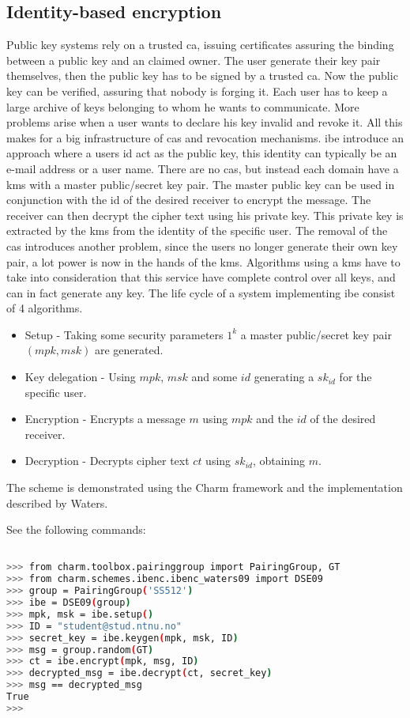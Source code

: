 \subsection{Identity-based encryption}\label{subsec:IBE}
Public key systems rely on a trusted \gls{ca}, issuing certificates assuring the binding between a public key and an claimed owner. The user generate their key pair themselves, then the public key has to be signed by a trusted \glsdesc{ca}. Now the public key can be verified, assuring that nobody is forging it. Each user has to keep a large archive of keys belonging to whom he wants to communicate. More problems arise when a user wants to declare his key invalid and revoke it. All this makes for a big infrastructure of \glspl{ca} and revocation mechanisms. \Gls{ibe}\cite{DBLP:ibe} introduce an approach where a users id act as the public key, this identity can typically be an e-mail address or a user name. There are no \glspl{ca}, but instead each domain have a \gls{kms} with a master public/secret key pair. The master public key can be used in conjunction with the id of the desired receiver to encrypt the message. The receiver can then decrypt the cipher text using his private key. This private key is extracted by the \gls{kms} from the identity of the specific user. The removal of the \glspl{ca} introduces another problem, since the users no longer generate their own key pair, a lot power is now in the hands of the \gls{kms}. Algorithms using a \gls{kms} have to take into consideration that this service have complete control over all keys, and can in fact generate any key. The life cycle of a system implementing \gls{ibe} consist of 4 algorithms. 

\begin{itemize}
\item Setup - Taking some security parameters $1^k$ a master public/secret key pair $(mpk, msk)$ are generated.
\item Key delegation - Using $mpk$, $msk$ and some $id$ generating a $sk_{id}$ for the specific user. 
\item Encryption - Encrypts a message $m$ using $mpk$ and the $id$ of the desired receiver. 
\item Decryption - Decrypts cipher text $ct$ using $sk_{id}$, obtaining $m$. 
\end{itemize}

The scheme is demonstrated using the Charm framework and the implementation described by Waters\cite{ibe_waters09}.

\noindent See the following commands:
\begin{lstlisting}[language=bash]

>>> from charm.toolbox.pairinggroup import PairingGroup, GT
>>> from charm.schemes.ibenc.ibenc_waters09 import DSE09
>>> group = PairingGroup('SS512')
>>> ibe = DSE09(group)
>>> mpk, msk = ibe.setup()
>>> ID = "student@stud.ntnu.no"
>>> secret_key = ibe.keygen(mpk, msk, ID)
>>> msg = group.random(GT)
>>> ct = ibe.encrypt(mpk, msg, ID)
>>> decrypted_msg = ibe.decrypt(ct, secret_key)
>>> msg == decrypted_msg
True
>>> 


\end{lstlisting}



